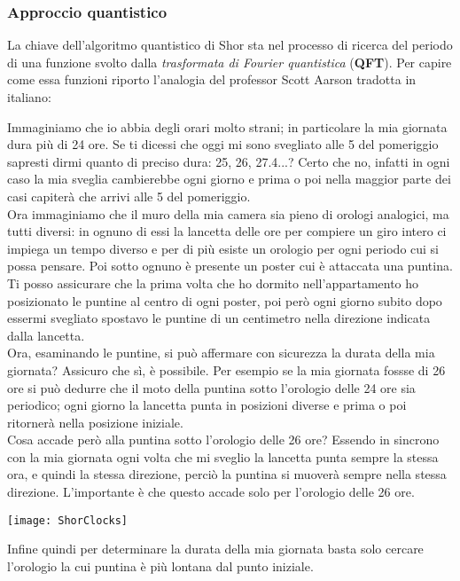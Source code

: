 \subsubsection{Approccio quantistico}
La chiave dell'algoritmo quantistico di Shor sta nel processo di ricerca del periodo di una funzione svolto dalla \textit{trasformata di Fourier quantistica} (\textbf{QFT}). Per capire come essa funzioni riporto l'analogia del professor Scott Aarson tradotta in italiano:
\begin{displayquote}
Immaginiamo che io abbia degli orari molto strani; in particolare la mia giornata dura più di 24 ore. Se ti dicessi che oggi mi sono svegliato alle 5 del pomeriggio sapresti dirmi quanto di preciso dura: 25, 26, 27.4...? Certo che no, infatti in ogni caso la mia sveglia cambierebbe ogni giorno e prima o poi nella maggior parte dei casi capiterà che arrivi alle 5 del pomeriggio.\\
Ora immaginiamo che il muro della mia camera sia pieno di orologi analogici, ma tutti diversi: in ognuno di essi la lancetta delle ore per compiere un giro intero ci impiega un tempo diverso e per di più esiste un orologio per ogni periodo cui si possa pensare. Poi sotto ognuno è presente un poster cui è attaccata una puntina. Ti posso assicurare che la prima volta che ho dormito nell'appartamento ho posizionato le puntine al centro di ogni poster, poi però ogni giorno subito dopo essermi svegliato spostavo le puntine di un centimetro nella direzione indicata dalla lancetta.\\
Ora, esaminando le puntine, si può affermare con sicurezza la durata della mia giornata? Assicuro che sì, è possibile. Per esempio se la mia giornata fossse di 26 ore si può dedurre che il moto della puntina sotto l'orologio delle 24 ore sia periodico; ogni giorno la lancetta punta in posizioni diverse e prima o poi ritornerà nella posizione iniziale.\\
Cosa accade però alla puntina sotto l'orologio delle 26 ore? Essendo in sincrono con la mia giornata ogni volta che mi sveglio la lancetta punta sempre la stessa ora, e quindi la stessa direzione, perciò la puntina si muoverà sempre nella stessa direzione. L'importante è che questo accade solo per l'orologio delle 26 ore.
\begin{center}
\texttt{[image: ShorClocks]}
\end{center}
Infine quindi per determinare la durata della mia giornata basta solo cercare l'orologio la cui puntina è più lontana dal punto iniziale.
\end{displayquote}
